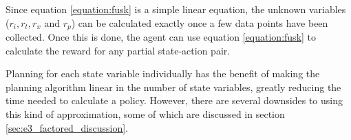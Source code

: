 Since equation \eqref{equation:fusk} is a simple linear equation, the unknown variables ($r_i, r_t, r_x$ and $r_p$) can be calculated exactly once a few data points have been collected. Once this is done, the agent can use equation \eqref{equation:fusk} to calculate the reward for any partial state-action pair. 

Planning for each state variable individually has the benefit of making the
planning algorithm linear in the number of state variables, greatly reducing
the time needed to calculate a policy. However, there are several downsides to
using this kind of approximation, some of which are discussed in section
\ref{sec:e3_factored_discussion}. 
